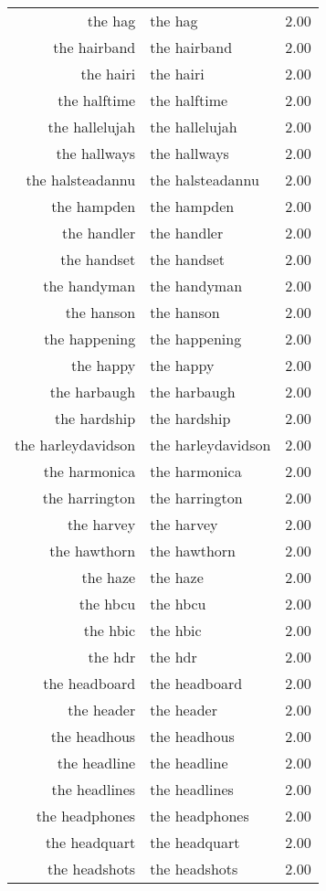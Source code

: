 \begin{table}[ht]
\begin{tabular}{rlr}
  the hag & the hag & 2.00 \\ 
  the hairband & the hairband & 2.00 \\ 
  the hairi & the hairi & 2.00 \\ 
  the halftime & the halftime & 2.00 \\ 
  the hallelujah & the hallelujah & 2.00 \\ 
  the hallways & the hallways & 2.00 \\ 
  the halsteadannu & the halsteadannu & 2.00 \\ 
  the hampden & the hampden & 2.00 \\ 
  the handler & the handler & 2.00 \\ 
  the handset & the handset & 2.00 \\ 
  the handyman & the handyman & 2.00 \\ 
  the hanson & the hanson & 2.00 \\ 
  the happening & the happening & 2.00 \\ 
  the happy & the happy & 2.00 \\ 
  the harbaugh & the harbaugh & 2.00 \\ 
  the hardship & the hardship & 2.00 \\ 
  the harleydavidson & the harleydavidson & 2.00 \\ 
  the harmonica & the harmonica & 2.00 \\ 
  the harrington & the harrington & 2.00 \\ 
  the harvey & the harvey & 2.00 \\ 
  the hawthorn & the hawthorn & 2.00 \\ 
  the haze & the haze & 2.00 \\ 
  the hbcu & the hbcu & 2.00 \\ 
  the hbic & the hbic & 2.00 \\ 
  the hdr & the hdr & 2.00 \\ 
  the headboard & the headboard & 2.00 \\ 
  the header & the header & 2.00 \\ 
  the headhous & the headhous & 2.00 \\ 
  the headline & the headline & 2.00 \\ 
  the headlines & the headlines & 2.00 \\ 
  the headphones & the headphones & 2.00 \\ 
  the headquart & the headquart & 2.00 \\ 
  the headshots & the headshots & 2.00 \\ 

\end{tabular}
\end{table}
